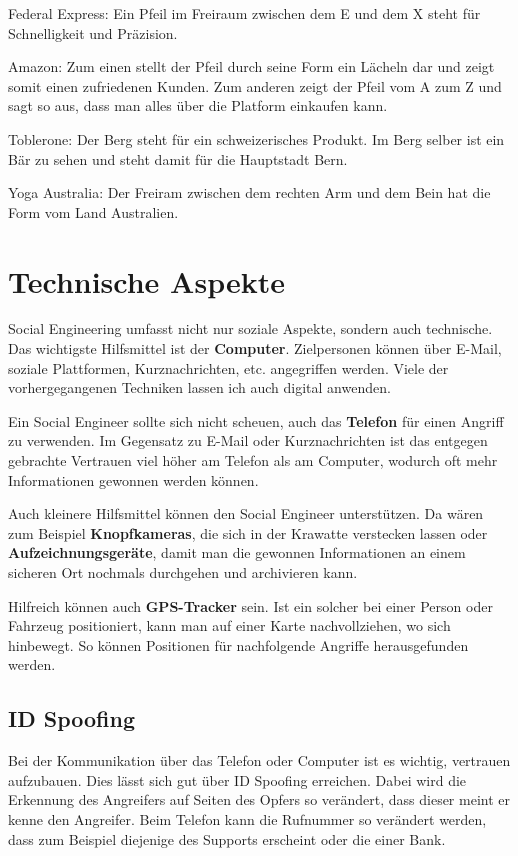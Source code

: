 
Federal Express: Ein Pfeil im Freiraum zwischen dem E und dem X steht für Schnelligkeit und Präzision.

Amazon: Zum einen stellt der Pfeil durch seine Form ein Lächeln dar und zeigt somit einen zufriedenen Kunden. Zum anderen zeigt der Pfeil vom A zum Z und sagt so aus, dass man alles über die Platform einkaufen kann.

Toblerone: Der Berg steht für ein schweizerisches Produkt. Im Berg selber ist ein Bär zu sehen und steht damit für die Hauptstadt Bern.

Yoga Australia: Der Freiram zwischen dem rechten Arm und dem Bein hat die Form vom Land Australien.

\section{Technische Aspekte}
Social Engineering umfasst nicht nur soziale Aspekte, sondern auch technische. Das wichtigste Hilfsmittel ist der \textbf{Computer}. Zielpersonen können über E-Mail, soziale Plattformen, Kurznachrichten, etc. angegriffen werden. Viele der vorhergegangenen Techniken lassen ich auch digital anwenden. 

Ein Social Engineer sollte sich nicht scheuen, auch das \textbf{Telefon} für einen Angriff zu verwenden. Im Gegensatz zu E-Mail oder Kurznachrichten ist das entgegen gebrachte Vertrauen viel höher am Telefon als am Computer, wodurch oft mehr Informationen gewonnen werden können.

Auch kleinere Hilfsmittel können den Social Engineer unterstützen. Da wären zum Beispiel \textbf{Knopfkameras}, die sich in der Krawatte verstecken lassen oder \textbf{Aufzeichnungsgeräte}, damit man die gewonnen Informationen an einem sicheren Ort nochmals durchgehen und archivieren kann.

Hilfreich können auch \textbf{GPS-Tracker} sein. Ist ein solcher bei einer Person oder Fahrzeug positioniert, kann man auf einer Karte nachvollziehen, wo sich hinbewegt. So können Positionen für nachfolgende Angriffe herausgefunden werden.

\subsection{ID Spoofing}
Bei der Kommunikation über das Telefon oder Computer ist es wichtig, vertrauen aufzubauen. Dies lässt sich gut über ID Spoofing erreichen. Dabei wird die Erkennung des Angreifers auf Seiten des Opfers so verändert, dass dieser meint er kenne den Angreifer. Beim Telefon kann die Rufnummer so verändert werden, dass zum Beispiel diejenige des Supports erscheint oder die einer Bank.

